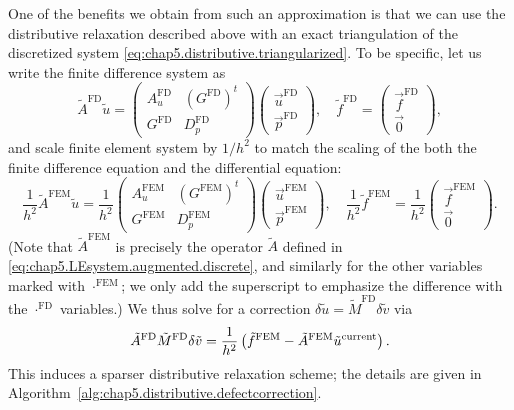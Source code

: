 One of the benefits we obtain from such an approximation is that we can use the distributive relaxation described above with an exact triangulation of the discretized system \eqref{eq:chap5.distributive.triangularized}. To be specific, let us write the finite difference system as
\begin{equation*}
\tilde{A}^{\text{FD}} \tilde{u} =
\begin{pmatrix} A_u^{\text{FD}} & (G^{\text{FD}})^t \\ G^{\text{FD}} & D_p^{\text{FD}} \end{pmatrix}
\begin{pmatrix} \vec{u}^{\text{FD}} \\ \vec{p}^{\text{FD}} \end{pmatrix}, \quad
\tilde{f}^{\text{FD}} = \begin{pmatrix} \vec{f}^{\text{FD}} \\ \vec{0} \end{pmatrix},
\end{equation*}
and scale finite element system by $1/h^2$ to match the scaling of the both the finite difference equation and the differential equation:
\begin{equation*}
\frac{1}{h^2} \tilde{A}^{\text{FEM}} \tilde{u} =
\frac{1}{h^2} \begin{pmatrix} A_u^{\text{FEM}} & (G^{\text{FEM}})^t \\ G^{\text{FEM}} & D_p^{\text{FEM}} \end{pmatrix}
\begin{pmatrix} \vec{u}^{\text{FEM}} \\ \vec{p}^{\text{FEM}} \end{pmatrix}, \quad
\frac{1}{h^2} \tilde{f}^{\text{FEM}} = \frac{1}{h^2} \begin{pmatrix} \vec{f}^{\text{FEM}} \\ \vec{0} \end{pmatrix}.
\end{equation*}
(Note that $\tilde{A}^{\text{FEM}}$ is precisely the operator $\tilde{A}$ defined in \eqref{eq:chap5.LEsystem.augmented.discrete}, and similarly for the other variables marked with $\cdot^{\text{FEM}}$; we only add the superscript to emphasize the difference with the $\cdot^{\text{FD}}$ variables.) We thus solve for a correction $\delta\tilde{u} = \tilde{M}^{\text{FD}} \delta\tilde{v}$ via
\begin{equation*}
\tilde{A}^{\text{FD}} \tilde{M}^{\text{FD}} \delta\tilde{v} = \frac{1}{h^2} \left( \tilde{f}^{\text{FEM}} - \tilde{A}^{\text{FEM}} \tilde{u}^{\text{current}} \right).
\end{equation*}
This induces a sparser distributive relaxation scheme; the details are given in Algorithm~\ref{alg:chap5.distributive.defectcorrection}.

